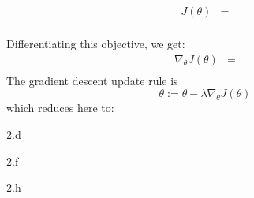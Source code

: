 \begin{answer}
  
  \begin{align*}
      J(\theta)&=\\
  \end{align*}

  Differentiating this objective, we get:
  \begin{align*}
      \nabla_{\theta} J(\theta)&=\\
  \end{align*}
  The gradient descent update rule is
  \begin{equation*}
  \theta := \theta - \lambda \nabla_{\theta} J(\theta)
  \end{equation*}
  which reduces here to:
\end{answer}
\clearpage

\LARGE
2.d
\normalsize

\begin{answer}
\end{answer}
\clearpage

\LARGE
2.f
\normalsize

\begin{answer}
\end{answer}
\clearpage

\LARGE
2.h
\normalsize

\begin{answer}
\end{answer}
\clearpage



